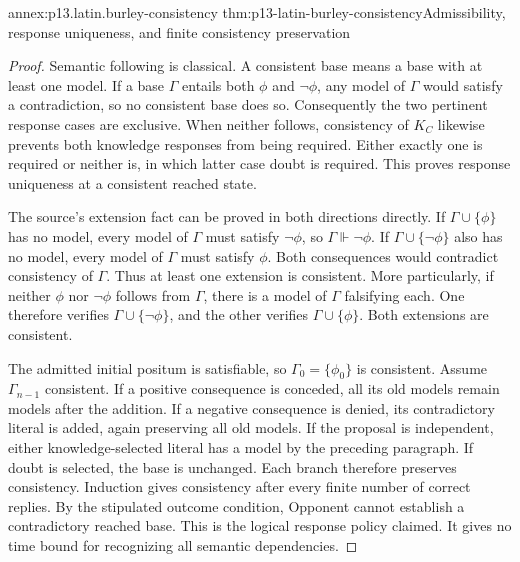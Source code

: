 \begin{annexitem}{annex:p13.latin.burley-consistency}
 {thm:p13-latin-burley-consistency}{Admissibility, response uniqueness, and finite consistency preservation}
\begin{proof}
Semantic following is classical. A consistent base means a base with
at least one model. If a base \(\Gamma\) entails both \(\phi\) and
\(\neg\phi\), any model of \(\Gamma\) would satisfy a contradiction,
so no consistent base does so.
Consequently the two pertinent response cases are exclusive.
When neither follows, consistency of \(K_C\) likewise prevents both
knowledge responses from being required. Either exactly one is required
or neither is, in which latter case doubt is required. This proves
response uniqueness at a consistent reached state.

The source's extension fact can be proved in both directions directly.
If \(\Gamma\cup\{\phi\}\) has no model, every model of \(\Gamma\)
must satisfy \(\neg\phi\), so \(\Gamma\Vdash\neg\phi\).
If \(\Gamma\cup\{\neg\phi\}\) also has no model, every model of
\(\Gamma\) must satisfy \(\phi\). Both consequences would contradict
consistency of \(\Gamma\).
Thus at least one extension is consistent.
More particularly, if neither \(\phi\) nor \(\neg\phi\) follows from
\(\Gamma\), there is a model of \(\Gamma\) falsifying each.
One therefore verifies \(\Gamma\cup\{\neg\phi\}\), and the other
verifies \(\Gamma\cup\{\phi\}\). Both extensions are consistent.

The admitted initial positum is satisfiable, so \(\Gamma_0=\{\phi_0\}\)
is consistent. Assume \(\Gamma_{n-1}\) consistent.
If a positive consequence is conceded, all its old models remain models
after the addition. If a negative consequence is denied, its contradictory
literal is added, again preserving all old models.
If the proposal is independent, either knowledge-selected literal
has a model by the preceding paragraph. If doubt is selected, the
base is unchanged. Each branch therefore preserves consistency.
Induction gives consistency after every finite number of correct replies.
By the stipulated outcome condition, Opponent cannot establish a
contradictory reached base. This is the logical response policy claimed.
It gives no time bound for recognizing all semantic dependencies.
\end{proof}
\end{annexitem}

